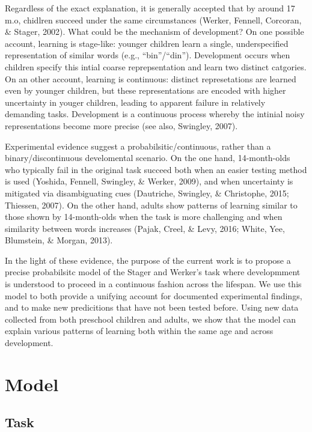 \documentclass[10pt, letterpaper]{article}
\begin{document}
Regardless of the exact explanation, it is generally accepted that by
around 17 m.o, chidlren succeed under the same circumstances (Werker,
Fennell, Corcoran, \& Stager, 2002). What could be the mechanism of
development? On one possible account, learning is stage-like: younger
children learn a single, underspecified representation of similar words
(e.g., ``bin''/``din''). Development occurs when children specify this
intial coarse reprepsentation and learn two distinct catgories. On an
other account, learning is continuous: distinct represetations are
learned even by younger children, but these representations are encoded
with higher uncertainty in youger children, leading to apparent failure
in relatively demanding tasks. Development is a continuous process
whereby the intinial noisy representations become more precise (see
also, Swingley, 2007).

Experimental evidence suggest a probabilsitic/continuous, rather than a
binary/discontinuous develomental scenario. On the one hand,
14-month-olds who typically fail in the original task succeed both when
an easier testing method is used (Yoshida, Fennell, Swingley, \& Werker,
2009), and when uncertainty is mitigated via disambiguating cues
(Dautriche, Swingley, \& Christophe, 2015; Thiessen, 2007). On the other
hand, adults show patterns of learning similar to those shown by
14-month-olds when the task is more challenging and when similarity
between words increases (Pajak, Creel, \& Levy, 2016; White, Yee,
Blumstein, \& Morgan, 2013).

In the light of these evidence, the purpose of the current work is to
propose a precise probabilsitc model of the Stager and Werker's task
where developmment is understood to proceed in a continuous fashion
across the lifespan. We use this model to both provide a unifying
account for documented experimental findings, and to make new
predicitions that have not been tested before. Using new data collected
from both preschool children and adults, we show that the model can
explain various patterns of learning both within the same age and across
development.

\section{Model}\label{model}

\subsection{Task}\label{task}
\end{document}
